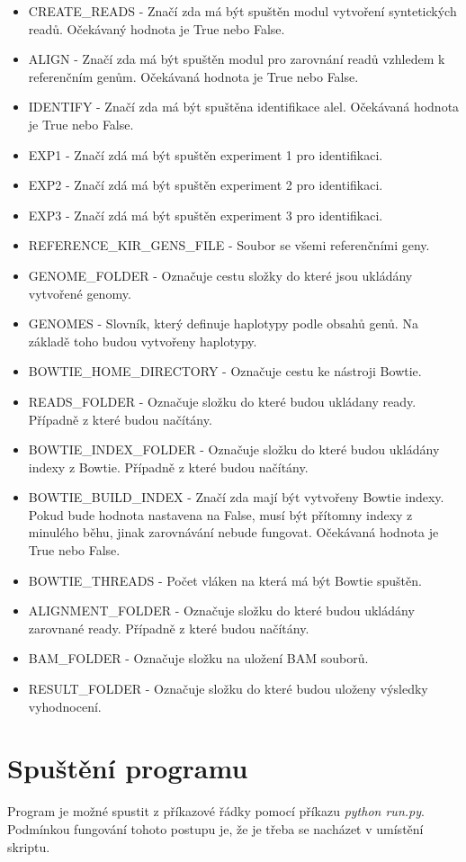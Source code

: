 \documentclass[czech,DP]{thesiskiv}
\numberwithin{equation}{section}
\begin{document}
\begin{itemize}
	\item CREATE\_READS - Značí zda má být spuštěn modul vytvoření syntetických readů. Očekávaný hodnota je True nebo False.
	\item ALIGN - Značí zda má být spuštěn modul pro zarovnání readů vzhledem k referenčním genům. Očekávaná hodnota je True nebo False.
	\item IDENTIFY - Značí zda má být spuštěna identifikace alel. Očekávaná hodnota je True nebo False.
	\item EXP1 - Značí zdá má být spuštěn experiment 1 pro identifikaci.
	\item EXP2 - Značí zdá má být spuštěn experiment 2 pro identifikaci.
	\item EXP3 - Značí zdá má být spuštěn experiment 3 pro identifikaci.
	\item REFERENCE\_KIR\_GENS\_FILE - Soubor se všemi referenčními geny. 
	\item GENOME\_FOLDER - Označuje cestu složky do které jsou ukládány vytvořené genomy. 
	\item GENOMES - Slovník, který definuje haplotypy podle obsahů genů. Na základě toho budou vytvořeny haplotypy.
	\item BOWTIE\_HOME\_DIRECTORY - Označuje cestu ke nástroji Bowtie.
	\item READS\_FOLDER - Označuje složku do které budou ukládany ready. Případně z které budou načítány.
	\item BOWTIE\_INDEX\_FOLDER - Označuje složku do které budou ukládány indexy z Bowtie. Případně z které budou načítány. 
	\item BOWTIE\_BUILD\_INDEX - Značí zda mají být vytvořeny Bowtie indexy. Pokud bude hodnota nastavena na False, musí být přítomny indexy z minulého běhu, jinak zarovnávání nebude fungovat. Očekávaná hodnota je True nebo False.
	\item BOWTIE\_THREADS - Počet vláken na která má být Bowtie spuštěn.	
	\item ALIGNMENT\_FOLDER - Označuje složku do které budou ukládány zarovnané ready. Případně z které budou načítány. 
	\item BAM\_FOLDER - Označuje složku na uložení BAM souborů.  
	\item RESULT\_FOLDER - Označuje složku do které budou uloženy výsledky vyhodnocení.
\end{itemize}


\section{Spuštění programu}
Program je možné spustit z příkazové řádky pomocí příkazu \textit {python run.py}. Podmínkou fungování tohoto postupu je, že je třeba se nacházet v umístění skriptu. 
\end{document}
